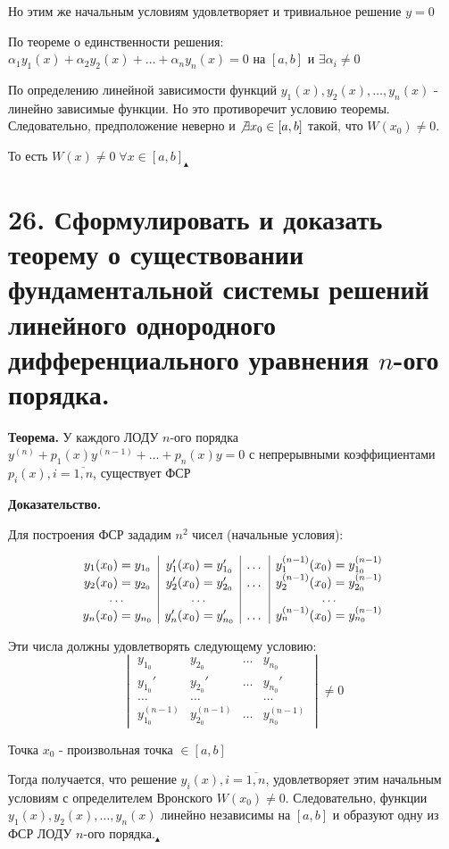 \documentclass[11pt]{article}
\begin{document}
\par Но этим же начальным условиям удовлетворяет и тривиальное решение $y = 0$
\par По теореме о единственности решения: $\alpha_{1}y_{1}(x) + \alpha_{2}y_{2}(x) + \dots + \alpha_{n}y_{n}(x) = 0$ на $[a, b]$ и $\exists\alpha_{i} \neq 0$
\par По определению линейной зависимости функций $y_{1}(x), y_{2}(x), \dots, y_{n}(x)$ - линейно зависимые функции. Но это противоречит условию теоремы. Следовательно, предположение неверно и $\not\exists x_{0} \in [a, b]$ такой, что $W(x_{0}) \neq 0$.
\par То есть $W(x) \neq 0 \; \forall x \in [a, b] _{\blacktriangle}$

\section*{26. Сформулировать и доказать теорему о существовании фундаментальной системы решений линейного однородного дифференциального уравнения $n$-ого порядка.}
\par\textbf{Теорема.} У каждого ЛОДУ $n$-ого порядка $y^{(n)} + p_{1}(x)y^{(n-1)} + \dots + p_{n}(x)y = 0$ с непрерывными коэффициентами $p_{i}(x), i = \overline{1, n}$, существует ФСР
\par\textbf{Доказательство.}
\par Для построения ФСР зададим $n^2$ чисел (начальные условия):
\par \[\begin{array}{c | c | c | c}
y_{1}(x_{0}) = y_{1_{0}} & y_{1}'(x_{0}) = y_{1_{0}}' & \dots & y_{1}^{(n-1)}(x_{0}) = y_{1_{0}}^{(n-1)} \\
y_{2}(x_{0}) = y_{2_{0}} & y_{2}'(x_{0}) = y_{2_{0}}' & \dots & y_{2}^{(n-1)}(x_{0}) = y_{2_{0}}^{(n-1)} \\
\dots & \dots & & \dots \\
y_{n}(x_{0}) = y_{n_{0}} & y_{n}'(x_{0}) = y_{n_{0}}' & \dots & y_{n}^{(n-1)}(x_{0}) = y_{n_{0}}^{(n-1)} 
\end{array}\]
\par Эти числа должны удовлетворять следующему условию:$$\begin{vmatrix}{}
y_{1_{0}} & y_{2_{0}} & \dots & y_{n_{0}} \\
y_{1_{0}}' & y_{2_{0}}' & \dots & y_{n_{0}}' \\
\dots & \dots & & \dots \\
y_{1_{0}}^{(n-1)} & y_{2_{0}}^{(n-1)} & \dots & y_{n_{0}}^{(n-1)}
\end{vmatrix} \neq 0$$
\par Точка $x_{0}$ - произвольная точка $\in [a, b]$
\par Тогда получается, что решение $y_{i}(x), i = \overline{1, n}$, удовлетворяет этим начальным условиям с определителем Вронского $W(x_{0}) \neq 0$. Следовательно, функции $y_{1}(x), y_{2}(x), \dots, y_{n}(x)$ линейно независимы на $[a, b]$ и образуют одну из ФСР ЛОДУ $n$-ого порядка.$_{\blacktriangle}$
\end{document}
